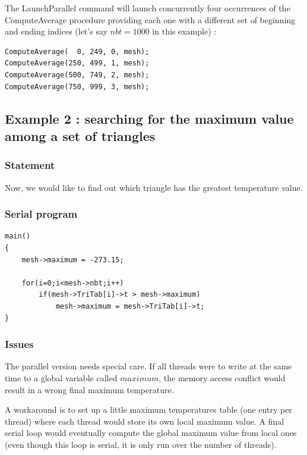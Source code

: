 \documentclass[a4paper,12pt]{article}
\begin{document}
The LaunchParallel command will launch concurrently four occurrences of the ComputeAverage procedure providing each one with a different set of beginning and ending indices (let's say $nbt = 1000$ in this example) :

\begin{tt}
\begin{verbatim}
ComputeAverage(  0, 249, 0, mesh);
ComputeAverage(250, 499, 1, mesh);
ComputeAverage(500, 749, 2, mesh);
ComputeAverage(750, 999, 3, mesh);
\end{verbatim}
\end{tt}
\normalfont


\subsection{Example 2 : searching for the maximum value among a set of triangles}

\subsubsection{Statement}
Now, we would like to find out which triangle has the greatest temperature value.

\subsubsection{Serial program}

\begin{tt}
\begin{verbatim}
main()
{
    mesh->maximum = -273.15;

    for(i=0;i<mesh->nbt;i++)
        if(mesh->TriTab[i]->t > mesh->maximum)
            mesh->maximum = mesh->TriTab[i]->t;
}
\end{verbatim}
\end{tt}
\normalfont

\subsubsection{Issues}

The parallel version needs special care. If all threads were to write at the same time to a global variable called $maximum$, the memory access conflict would result in a wrong final maximum temperature.

A workaround is to set up a little maximum temperatures table (one entry per thread) where each thread would store its own local maximum value. A final serial loop would eventually compute the global maximum value from local ones (even though this loop is serial, it is only run over the number of threads).
\end{document}
